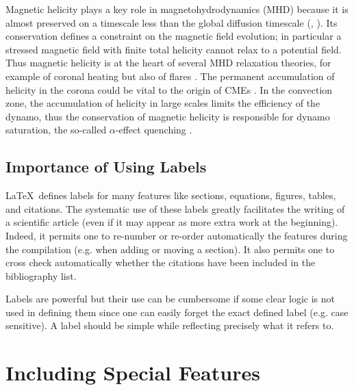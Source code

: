 \documentclass[namedreferences,hyperref,optionalrh]{spr-sola}
\begin{document}
Magnetic helicity plays a key role in magnetohydrodynamics (MHD)
because it is almost preserved on a timescale less than the global
diffusion timescale (\citealp{Berger84}, \citeyear{Berger03}).  
Its conservation defines a
constraint on the magnetic field evolution; in particular a
stressed magnetic field with finite total helicity cannot relax to
a potential field.  Thus magnetic helicity is at the heart of
several MHD relaxation theories, for example of coronal heating
\citep{Heyvaerts84} but also of flares \citep{Kusano04,Melrose04}.
The permanent accumulation of helicity in the corona could be
vital to the origin of CMEs \citep{Rust94,Low97}.  In the
convection zone, the accumulation of helicity in large scales
limits the efficiency of the dynamo, thus the conservation of
magnetic helicity is responsible for dynamo saturation, the
so-called $\alpha$-effect quenching \citep{Brandenburg01}.

\subsection{Importance of Using Labels} %
  \label{S-labels}

    \LaTeX\ defines labels for many features like sections, 
equations, figures, tables, and citations.  The systematic use
of these labels greatly facilitates the writing of a scientific
article (even if it may appear as more extra work at the beginning).
Indeed, it permits one to re-number or re-order automatically the
features during the compilation (e.g. when adding or moving a 
section).  It also permits one to
cross check automatically whether the citations have been included
in the bibliography list.

    Labels are powerful but their use can be cumbersome if some
clear logic is not used in defining them since one can easily
forget the exact defined label (e.g. case sensitive).
A label should be simple while reflecting precisely what it refers to. 
    
\section{Including Special Features} %
      \label{S-features}      
\end{document}
